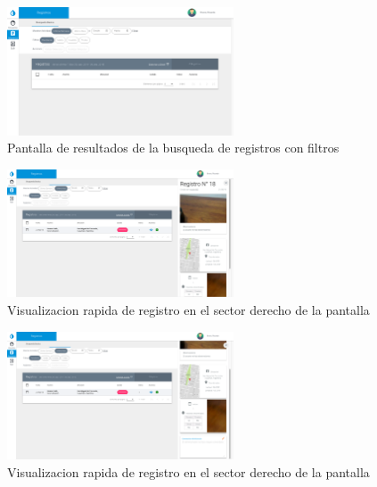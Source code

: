 				\begin{figure}
					\centering
						\includegraphics[width=0.6\textwidth]{Screenshots/web/registroListar.png}
								\caption{Pantalla de resultados de la busqueda de registros con filtros}
						\label{fig:busqueda}
				\end{figure}

			
				\begin{figure}
					\centering
						\includegraphics[width=0.6\textwidth]{Screenshots/web/registroVer1.png}
								\caption{Visualizacion rapida de registro en el sector derecho de la pantalla}
				\end{figure}

				\begin{figure}
					\centering
						\includegraphics[width=0.6\textwidth]{Screenshots/web/registroVer2.png}
								\caption{Visualizacion rapida de registro en el sector derecho de la pantalla}

				\end{figure}

